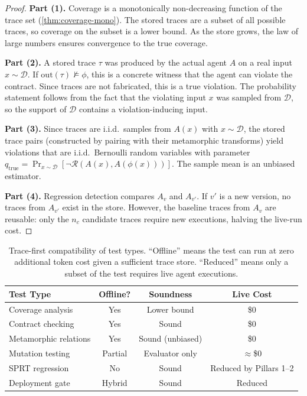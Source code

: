\begin{proof}
\textbf{Part (1).}
Coverage is a monotonically non-decreasing function of the trace set
(\cref{thm:coverage-mono}). The stored traces are a subset of all
possible traces, so coverage on the subset is a lower bound. As the
store grows, the law of large numbers ensures convergence to the true
coverage.

\textbf{Part (2).}
A stored trace $\tau$ was produced by the actual agent $A$ on a real
input $x \sim \mathcal{D}$. If $\mathrm{out}(\tau) \not\models \phi$,
this is a concrete witness that the agent can violate the contract.
Since traces are not fabricated, this is a true violation. The
probability statement follows from the fact that the violating input
$x$ was sampled from $\mathcal{D}$, so the support of $\mathcal{D}$
contains a violation-inducing input.

\textbf{Part (3).}
Since traces are i.i.d.\ samples from $A(x)$ with
$x \sim \mathcal{D}$, the stored trace pairs (constructed by pairing
with their metamorphic transforms) yield violations that are i.i.d.\
Bernoulli random variables with parameter
$q_{\mathrm{true}} = \Pr_{x \sim \mathcal{D}}[\neg\mathcal{R}(A(x),
A(\phi(x)))]$. The sample mean is an unbiased estimator.

\textbf{Part (4).}
Regression detection compares $A_v$ and $A_{v'}$. If $v'$ is a new
version, no traces from $A_{v'}$ exist in the store. However, the
baseline traces from $A_v$ are reusable: only the $n_c$ candidate
traces require new executions, halving the live-run cost. \qedhere
\end{proof}

\begin{table}[t]
\centering
\caption{Trace-first compatibility of \agentassay{} test types.
  ``Offline'' means the test can run at zero additional token cost given
  a sufficient trace store. ``Reduced'' means only a subset of the
  test requires live agent executions.}
\label{tab:trace-first}
\small
\begin{tabular}{lccc}
\toprule
\textbf{Test Type} & \textbf{Offline?} & \textbf{Soundness} &
  \textbf{Live Cost} \\
\midrule
Coverage analysis & Yes & Lower bound & \$0 \\
Contract checking & Yes & Sound & \$0 \\
Metamorphic relations & Yes & Sound (unbiased) & \$0 \\
Mutation testing & Partial & Evaluator only & $\approx$\$0 \\
SPRT regression & No & Sound & Reduced by Pillars 1--2 \\
Deployment gate & Hybrid & Sound & Reduced \\
\bottomrule
\end{tabular}
\end{table}


